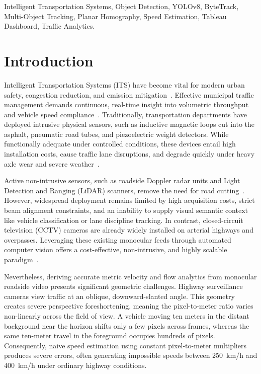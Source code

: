 \documentclass[conference]{IEEEtran}
\begin{document}
\begin{IEEEkeywords}
Intelligent Transportation Systems, Object Detection, YOLOv8, ByteTrack, Multi-Object Tracking, Planar Homography, Speed Estimation, Tableau Dashboard, Traffic Analytics.
\end{IEEEkeywords}

\section{Introduction}
Intelligent Transportation Systems (ITS) have become vital for modern urban safety, congestion reduction, and emission mitigation~\cite{buch2011review}. Effective municipal traffic management demands continuous, real-time insight into volumetric throughput and vehicle speed compliance~\cite{kanhere2008taxonomy}. Traditionally, transportation departments have deployed intrusive physical sensors, such as inductive magnetic loops cut into the asphalt, pneumatic road tubes, and piezoelectric weight detectors. While functionally adequate under controlled conditions, these devices entail high installation costs, cause traffic lane disruptions, and degrade quickly under heavy axle wear and severe weather~\cite{schoepflin2003dynamic}.

Active non-intrusive sensors, such as roadside Doppler radar units and Light Detection and Ranging (LiDAR) scanners, remove the need for road cutting~\cite{he2019vehicle}. However, widespread deployment remains limited by high acquisition costs, strict beam alignment constraints, and an inability to supply visual semantic context like vehicle classification or lane discipline tracking. In contrast, closed-circuit television (CCTV) cameras are already widely installed on arterial highways and overpasses. Leveraging these existing monocular feeds through automated computer vision offers a cost-effective, non-intrusive, and highly scalable paradigm~\cite{dubska2014fully}.

Nevertheless, deriving accurate metric velocity and flow analytics from monocular roadside video presents significant geometric challenges. Highway surveillance cameras view traffic at an oblique, downward-slanted angle. This geometry creates severe perspective foreshortening, meaning the pixel-to-meter ratio varies non-linearly across the field of view. A vehicle moving ten meters in the distant background near the horizon shifts only a few pixels across frames, whereas the same ten-meter travel in the foreground occupies hundreds of pixels. Consequently, naive speed estimation using constant pixel-to-meter multipliers produces severe errors, often generating impossible speeds between 250~km/h and 400~km/h under ordinary highway conditions.
\end{document}
